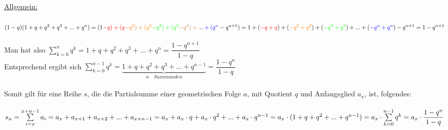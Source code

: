 \begin{Beweis}
\underline{Allgemein:}\\
\\
$(1-q)(1+q+q^2+q^3+...+q^n)\\
=(1\textcolor{red}{-q)+(q}\textcolor{orange}{-q^2)+(q^2}\textcolor{green}{-q^3)+(q^3}\textcolor{brown}{-q^4)+.}.\textcolor{blue}{.+(q^n}-q^{n+1})\\
=1+(\textcolor{red}{-q+q})+(\textcolor{orange}{-q^2+q^2})+(\textcolor{green}{-q^3+q^3})+...+(\textcolor{blue}{-q^n+q^n})-q^{n+1}\\
=1-q^{n+1}$\\
\\
Man hat also $\sum\limits_{k=0}^nq^k=1+q+q^2+q^3+...+q^n=\dfrac{1-q^{n+1}}{1-q}$\\
Entsprechend ergibt sich $\sum\limits_{k=0}^{n-1}q^k=\underbrace{1+q+q^2+q^3+...+q^{n-1}}_{n\quad Summanden}=\dfrac{1-q^n}{1-q}$\\
\\
Somit gilt für eine Reihe $s$, die die Partialsumme einer geometrischen Folge $a$, mit Quotient $q$ und Anfangsglied $a_{x}$, ist, folgendes:\\
\\
$s_{n}=\sum\limits_{i=x}^{x+n-1}a_{i}\\
=a_{x}+a_{x+1}+a_{x+2}+...+a_{x+n-1}\\
=a_{x}+a_{x}\cdot q+a_{x}\cdot q^{2}+...+a_{x}\cdot q^{n-1}\\
=a_{x}\cdot(1+q+q^2+...+q^{n-1})\\
=a_{x}\cdot \sum\limits_{k=0}^{n-1}q^k\\
=a_{x}\cdot \dfrac{1-q^{n}}{1-q}$
\end{Beweis}
